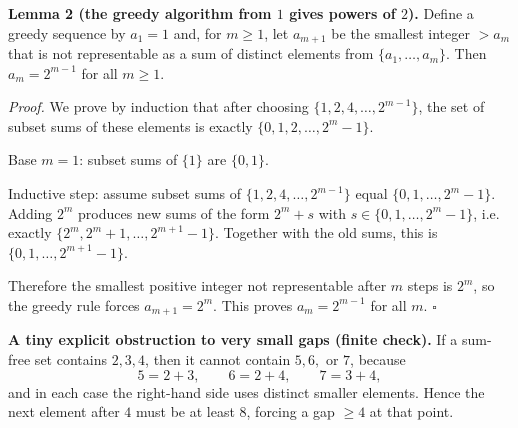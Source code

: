 \medskip
\noindent\textbf{Lemma 2 (the greedy algorithm from $1$ gives powers of $2$).}
Define a greedy sequence by $a_1=1$ and, for $m\ge 1$, let $a_{m+1}$ be the smallest integer $>a_m$ that is not representable as a sum of distinct elements from $\{a_1,\dots,a_m\}$.
Then $a_m=2^{m-1}$ for all $m\ge 1$.

\noindent\emph{Proof.}
We prove by induction that after choosing $\{1,2,4,\dots,2^{m-1}\}$, the set of subset sums of these elements is exactly $\{0,1,2,\dots,2^{m}-1\}$.

Base $m=1$: subset sums of $\{1\}$ are $\{0,1\}$.

Inductive step: assume subset sums of $\{1,2,4,\dots,2^{m-1}\}$ equal $\{0,1,\dots,2^m-1\}$. Adding $2^m$ produces new sums of the form $2^m+s$ with $s\in\{0,1,\dots,2^m-1\}$, i.e. exactly $\{2^m,2^m+1,\dots,2^{m+1}-1\}$. Together with the old sums, this is $\{0,1,\dots,2^{m+1}-1\}$.

Therefore the smallest positive integer not representable after $m$ steps is $2^m$, so the greedy rule forces $a_{m+1}=2^m$. This proves $a_m=2^{m-1}$ for all $m$.
\hfill$\square$

\medskip
\noindent\textbf{A tiny explicit obstruction to very small gaps (finite check).}
If a sum-free set contains $2,3,4$, then it cannot contain $5,6,$ or $7$, because
\[
5=2+3,\qquad 6=2+4,\qquad 7=3+4,
\]
and in each case the right-hand side uses distinct smaller elements.
Hence the next element after $4$ must be at least $8$, forcing a gap $\ge 4$ at that point.

